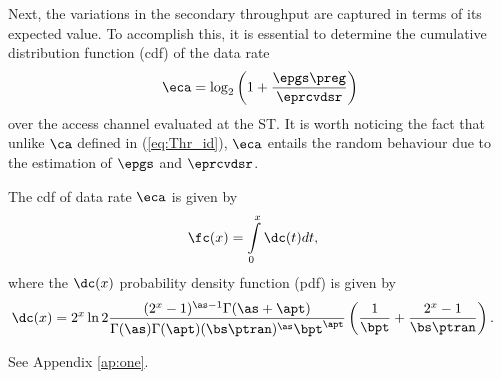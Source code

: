 Next, the variations in the secondary throughput are captured in terms of its expected value. To accomplish this, it is essential to determine the cumulative distribution function (cdf) of the data rate 
\begin{align}
\eca  = \log_2 \left(1 + \frac{\epgs \preg}{\eprcvdsr} \right) \label{eq:eca}
\end{align}
over the access channel evaluated at the ST. It is worth noticing the fact that unlike $\ca$ defined in (\ref{eq:Thr_id}), $\eca$ entails the random behaviour due to the estimation of $\epgs$ and $\eprcvdsr$.
\begin{lemma} \label{lm:lm5}
\normalfont 
The cdf of data rate $\eca$ is given by
\begin{align}
\fc(x) &= \int\limits_{0}^{x} \dc(t) dt, \label{eq:dis_C} 
\end{align}
where the $\dc(x)$ probability density function (pdf) is given by 
\begin{align}
\dc(x) &= 2^x \ln 2 \frac{(2^x - 1)^{\as - 1} \Gamma(\as + \apt)}{\Gamma(\as) \Gamma(\apt) (\bs \ptran) ^{\as} \bpt^{\apt}} \left(\frac{1}{\bpt} + \frac{2^x - 1}{\bs \ptran}\right). \label{eq:den_C}
\end{align}
\end{lemma}
\begin{IEEEproof}
See Appendix \ref{ap:one}.
\end{IEEEproof}


